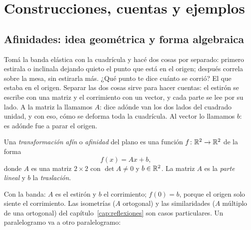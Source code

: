 \section{Construcciones, cuentas y ejemplos}

\subsection{Afinidades: idea geométrica y forma algebraica}\label{sec:afinidades-geom}

Tomá la banda elástica con la cuadrícula y hacé dos cosas por separado: primero estirala o
inclinala dejando quieto el punto que está en el origen; después correla sobre la mesa, sin estirarla más. ¿Qué punto te dice
cuánto se corrió? El que estaba en el origen. Separar las dos cosas sirve para hacer cuentas:
el estirón se escribe con una matriz y el corrimiento con un vector, y cada parte se lee por su
lado. A la matriz la llamamos \(A\): dice adónde van los dos lados del cuadrado unidad, y con
eso, cómo se deforma toda la cuadrícula. Al vector lo llamamos \(b\): es adónde fue a parar el
origen.

\begin{definicion}\label{def:06-afinidad}
Una \emph{transformación afín} o \emph{afinidad} del plano es una función
\(f\colon\mathbb{R}^2\to\mathbb{R}^2\) de la forma
\[
  \boxed{f(x)=Ax+b},
\]
donde \(A\) es una matriz \(2\times2\) con \(\det A\neq0\) y \(b\in\mathbb{R}^2\). La matriz \(A\) es
la \emph{parte lineal} y \(b\) la \emph{traslación}.
\end{definicion}

Con la banda: \(A\) es el estirón y \(b\) el corrimiento; \(f(0)=b\), porque el origen solo
siente el corrimiento. Las isometrías (\(A\) ortogonal) y las similaridades (\(A\) múltiplo de
una ortogonal) del capítulo~\ref{cap:reflexiones} son casos particulares. Un paralelogramo va
a otro paralelogramo:

\begin{center}
\end{center}

